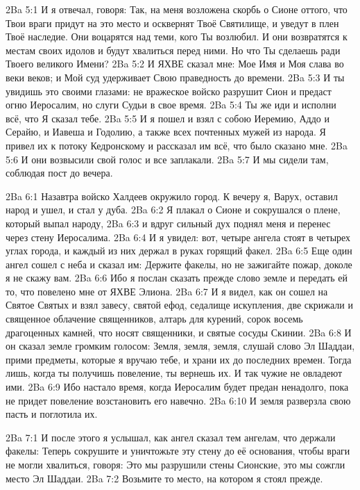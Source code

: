 \vs 2Ba 5:1
И я отвечал, говоря: Так, на меня возложена скорбь о Сионе оттого, что Твои враги придут на это место и осквернят Твоё Святилище, и уведут в плен Твоё наследие. Они воцарятся над теми, кого Ты возлюбил. И они возвратятся к местам своих идолов и будут хвалиться перед ними. Но что Ты сделаешь ради Твоего великого Имени?
\vs 2Ba 5:2
И ЯХВЕ сказал мне: Мое Имя и Моя слава во веки веков; и Мой суд удерживает Свою праведность до времени.
\vs 2Ba 5:3
И ты увидишь это своими глазами: не вражеское войско разрушит Сион и предаст огню Иеросалим, но слуги Судьи в свое время.
\vs 2Ba 5:4
Ты же иди и исполни всё, что Я сказал тебе.
\vs 2Ba 5:5
И я пошел и взял с собою Иеремию, Аддо и Серайю, и Иавеша и Годолию, а также всех почтенных мужей из народа. Я привел их к потоку Кедронскому и рассказал им всё, что было сказано мне.
\vs 2Ba 5:6
И они возвысили свой голос и все заплакали.
\vs 2Ba 5:7
И мы сидели там, соблюдая пост до вечера.

\vs 2Ba 6:1
Назавтра войско Халдеев окружило город. К вечеру я, Варух, оставил народ и ушел, и стал у дуба.
\vs 2Ba 6:2
Я плакал о Сионе и сокрушался о плене, который выпал народу,
\vs 2Ba 6:3
и вдруг сильный дух поднял меня и перенес через стену Иеросалима.
\vs 2Ba 6:4
И я увидел: вот, четыре ангела стоят в четырех углах города, и каждый из них держал в руках горящий факел.
\vs 2Ba 6:5
Еще один ангел сошел с неба и сказал им: Держите факелы, но не зажигайте пожар, доколе я не скажу вам.
\vs 2Ba 6:6
Ибо я послан сказать прежде слово земле и передать ей то, что повелено мне от ЯХВЕ Элиона.
\vs 2Ba 6:7
И я видел, как он сошел на Святое Святых и взял завесу, святой ефод, седалище искупления, две скрижали и священное облачение священников, алтарь для курений, сорок восемь драгоценных камней, что носят священники, и святые сосуды Скинии.
\vs 2Ba 6:8
И он сказал земле громким голосом: Земля, земля, земля, слушай слово Эл Шаддаи, прими предметы, которые я вручаю тебе, и храни их до последних времен. Тогда лишь, когда ты получишь повеление, ты вернешь их. И так чужие не овладеют ими.
\vs 2Ba 6:9
Ибо настало время, когда Иеросалим будет предан ненадолго, пока не придет повеление возстановить его навечно.
\vs 2Ba 6:10
И земля разверзла свою пасть и поглотила их.

\vs 2Ba 7:1
И после этого я услышал, как ангел сказал тем ангелам, что держали факелы: Теперь сокрушите и уничтожьте эту стену до её основания, чтобы враги не могли хвалиться, говоря: Это мы разрушили стены Сионские, это мы сожгли место Эл Шаддаи.
\vs 2Ba 7:2
Возьмите то место, на котором я стоял прежде.


